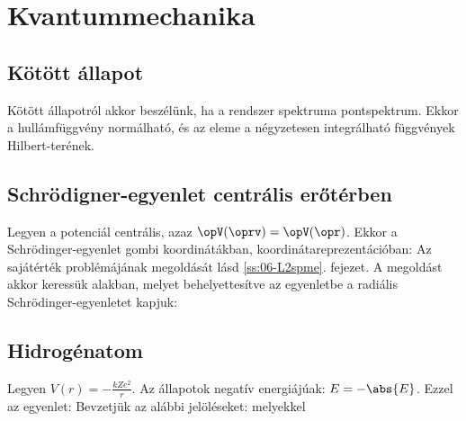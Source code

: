  \section{Kvantummechanika}
  
  \subsection{Kötött állapot} 
   
   Kötött állapotról akkor beszélünk, ha a rendszer spektruma pontspektrum.
   Ekkor a hullámfüggvény normálható, és az eleme a négyzetesen integrálható függvények Hilbert-terének.
   
  \subsection{Schrödigner-egyenlet centrális erőtérben}
   
   Legyen a potenciál centrális, azaz $\opV(\oprv)=\opV(\opr)$.
   Ekkor a Schrödinger-egyenlet gombi koordinátákban, koordinátareprezentációban:
   Az 
   sajátérték problémájának megoldását lásd \ref{ss:06-L2spme}. fejezet.
   A megoldást akkor keressük
   alakban, melyet behelyettesítve az egyenletbe a radiális Schrödinger-egyenletet kapjuk:
   
  \subsection{Hidrogénatom}
   
   Legyen $V(r)=-\frac{kZe^2}{r}$.
   Az állapotok negatív energiájúak: $E=-\abs{E}$.
   Ezzel az egyenlet:
   Bevzetjük az alábbi jelöléseket:
   melyekkel
   
